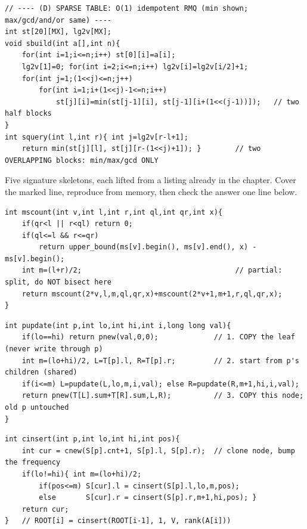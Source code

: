 \begin{lstlisting}
// ---- (D) SPARSE TABLE: O(1) idempotent RMQ (min shown; max/gcd/and/or same) ----
int st[20][MX], lg2v[MX];
void sbuild(int a[],int n){
    for(int i=1;i<=n;i++) st[0][i]=a[i];
    lg2v[1]=0; for(int i=2;i<=n;i++) lg2v[i]=lg2v[i/2]+1;
    for(int j=1;(1<<j)<=n;j++)
        for(int i=1;i+(1<<j)-1<=n;i++)
            st[j][i]=min(st[j-1][i], st[j-1][i+(1<<(j-1))]);   // two half blocks
}
int squery(int l,int r){ int j=lg2v[r-l+1];
    return min(st[j][l], st[j][r-(1<<j)+1]); }        // two OVERLAPPING blocks: min/max/gcd ONLY
\end{lstlisting}


Five signature skeletons, each lifted from a listing already in the chapter. Cover
the marked line, reproduce from memory, then check the answer one line below.

\begin{lstlisting}[caption={Drill 1 -- merge-sort tree range count: bisect each canonical node (from lst:c19-mst-count)}]
int mscount(int v,int l,int r,int ql,int qr,int x){
    if(qr<l || r<ql) return 0;
    if(ql<=l && r<=qr)
        return upper_bound(ms[v].begin(), ms[v].end(), x) - ms[v].begin();
    int m=(l+r)/2;                                    // partial: split, do NOT bisect here
    return mscount(2*v,l,m,ql,qr,x)+mscount(2*v+1,m+1,r,ql,qr,x);
}
\end{lstlisting}

\begin{lstlisting}[caption={Drill 2 -- persistent update: copy the spine and the leaf, share the rest (from lst:c19-pseg)}]
int pupdate(int p,int lo,int hi,int i,long long val){
    if(lo==hi) return pnew(val,0,0);             // 1. COPY the leaf (never write through p)
    int m=(lo+hi)/2, L=T[p].l, R=T[p].r;         // 2. start from p's children (shared)
    if(i<=m) L=pupdate(L,lo,m,i,val); else R=pupdate(R,m+1,hi,i,val);
    return pnew(T[L].sum+T[R].sum,L,R);          // 3. COPY this node; old p untouched
}
\end{lstlisting}

\begin{lstlisting}[caption={Drill 3 -- chairman insert: one path copy, count +1 down the spine (from lst:c19-chairman)}]
int cinsert(int p,int lo,int hi,int pos){
    int cur = cnew(S[p].cnt+1, S[p].l, S[p].r);  // clone node, bump the frequency
    if(lo!=hi){ int m=(lo+hi)/2;
        if(pos<=m) S[cur].l = cinsert(S[p].l,lo,m,pos);
        else       S[cur].r = cinsert(S[p].r,m+1,hi,pos); }
    return cur;
}   // ROOT[i] = cinsert(ROOT[i-1], 1, V, rank(A[i]))
\end{lstlisting}

